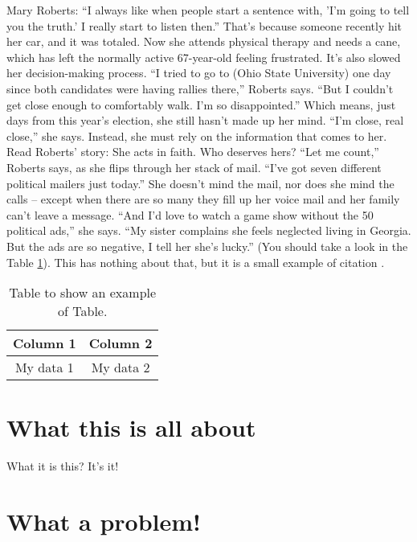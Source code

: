 \documentclass[%
        TwoSidePages,%
        Portuguese,%
        FinalVersion,%
        TablesPage,%
        FiguresPage,%
        ]%
{ic-tese-v2}
\begin{document}
Mary Roberts: ``I always like when people start a sentence with, 'I'm going to tell you the truth.' I really start to listen then.''
That's because someone recently hit her car, and it was totaled. Now she attends physical therapy and needs a cane, which has left the normally active 67-year-old feeling frustrated. It's also slowed her decision-making process.
``I tried to go to (Ohio State University) one day since both candidates were having rallies there,'' Roberts says. ``But I couldn't get close enough to comfortably walk. I'm so disappointed.''
Which means, just days from this year's election, she still hasn't made up her mind.
``I'm close, real close,'' she says.
Instead, she must rely on the information that comes to her.
Read Roberts' story: She acts in faith. Who deserves hers?
``Let me count,'' Roberts says, as she flips through her stack of mail. ``I've got seven different political mailers just today.''
She doesn't mind the mail, nor does she mind the calls -- except when there are so many they fill up her voice mail and her family can't leave a message.
``And I'd love to watch a game show without the 50 political ads,'' she says. ``My sister complains she feels neglected living in Georgia. But the ads are so negative, I tell her she's lucky.'' (You should take a look in the Table \ref{Tab:example}). This has nothing about that, but it is a small example of citation \cite{smallest_example2013}.

\begin{table}
        \center
        \caption{Table to show an example of Table.}
        \label{Tab:example}
        \begin{tabular}{c|c}
                \hline
                        Column 1 & Column 2\\
                \hline
                        My data 1 & My data 2\\
                \hline
        \end{tabular}
\end{table}

\section{What this is all about}

What it is this? It's it!

\section{What a problem!}
\end{document}
